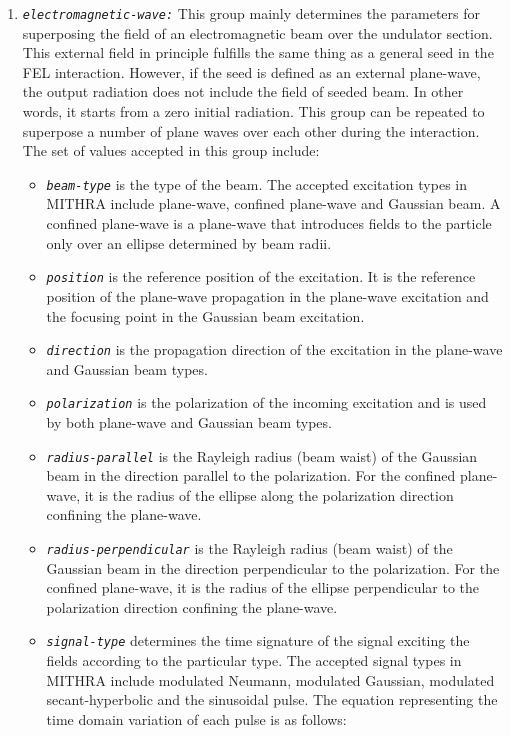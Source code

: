 \begin{enumerate}
%
\item {\tt \small \em electromagnetic-wave:} This group mainly determines the parameters for superposing the field of an electromagnetic beam over the undulator section. This external field in principle fulfills the same thing as a general seed in the FEL interaction. However, if the seed is defined as an external plane-wave, the output radiation does not include the field of seeded beam. In other words, it starts from a zero initial radiation. This group can be repeated to superpose a number of plane waves over each other during the interaction. The set of values accepted in this group include:
%
\begin{itemize}
    \item {\tt \small \em beam-type} is the type of the beam. The accepted excitation types in MITHRA include plane-wave, confined plane-wave and Gaussian beam. A confined plane-wave is a plane-wave that introduces fields to the particle only over an ellipse determined by beam radii.
    \item {\tt \small \em position} is the reference position of the excitation. It is the reference position of the plane-wave propagation in the plane-wave excitation and the focusing point in the Gaussian beam excitation.
	\item {\tt \small \em direction} is the propagation direction of the excitation in the plane-wave and Gaussian beam types.
	\item {\tt \small \em polarization} is the polarization of the incoming excitation and is used by both plane-wave and Gaussian beam types.
	\item {\tt \small \em radius-parallel} is the Rayleigh radius (beam waist) of the Gaussian beam in the direction parallel to the polarization. For the confined plane-wave, it is the radius of the ellipse along the polarization direction confining the plane-wave.
	\item {\tt \small \em radius-perpendicular} is the Rayleigh radius (beam waist) of the Gaussian beam in the direction perpendicular to the polarization. For the confined plane-wave, it is the radius of the ellipse perpendicular to the polarization direction confining the plane-wave.
	\item {\tt \small \em signal-type} determines the time signature of the signal exciting the fields according to the particular type. The accepted signal types in MITHRA include modulated Neumann, modulated Gaussian, modulated secant-hyperbolic and the sinusoidal pulse. The equation representing the time domain variation of each pulse is as follows:

\end{itemize}
\end{enumerate}
